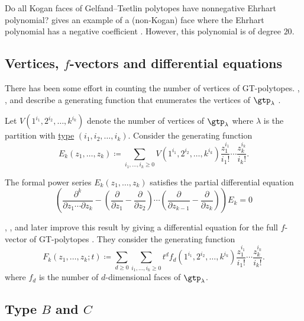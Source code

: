 \begin{question}
Do all Kogan faces of Gelfand--Tsetlin polytopes have nonnegative Ehrhart
polynomial?
 gives an example of a (non-Kogan) face where the
Ehrhart polynomial has a negative coefficient
\cite{Alexandersson2019CounterExamples}.  However, this polynomial is of
degree $20$.
\end{question}


\subsection[gtpolytopesFVectors]{Vertices, $f$-vectors and differential equations}

There has been some effort in counting the number of vertices of GT-polytopes.
, , and
 describe a generating function that enumerates the
vertices of $\gtp_{\lambda}$ \cite{GusevKiritchenkoTimorin2013}.

Let $V(1^{i_1},2^{i_2},\dotsc,k^{i_k})$ denote the number of vertices of
$\gtp_{\lambda}$ where $\lambda$ is the partition with
\hyperref[prelimPartitions]{type} $(i_1,i_2,\dotsc,i_k)$.
Consider the generating function
\[
E_k(z_1,\dotsc,z_k) \coloneqq
\sum_{i_1,\dotsc,i_k \geq 0}
V(1^{i_1},2^{i_2},\dotsc,k^{i_k})
\frac{z_1^{i_1}}{i_1!} \dotsm \frac{z_k^{i_k}}{i_k!}.
\]
\begin{theorem}
The formal power series $E_k(z_1,\dotsc,z_k)$ satisfies the partial
differential equation
\[
\left( \frac{\partial^k}{\partial z_1 \dotsm \partial z_k} -
\left(\frac{\partial}{\partial z_1}-\frac{\partial}{\partial z_2}\right)
\dotsm
\left(\frac{\partial}{\partial z_{k-1}}-\frac{\partial}{\partial z_k}\right)
\right)E_k = 0
\]
\end{theorem}

, , and 
later improve this result by giving a differential equation for the full
$f$-vector of GT-polytopes \cite[Thm.~1.14]{AnChoKim2018}.
They consider the generating function
\[
F_k(z_1,\dotsc,z_k;t) \coloneqq
\sum_{d\geq 0} \sum_{i_1,\dotsc,i_k \geq 0}
t^d f_d(1^{i_1},2^{i_2},\dotsc,k^{i_k})
\frac{z_1^{i_1}}{i_1!} \dotsm \frac{z_k^{i_k}}{i_k!}.
\]
where $f_d$ is the number of $d$-dimensional faces of $\gtp_{\lambda}$.


\subsection[gtpolytopesTypeBCD]{Type $B$ and $C$}

